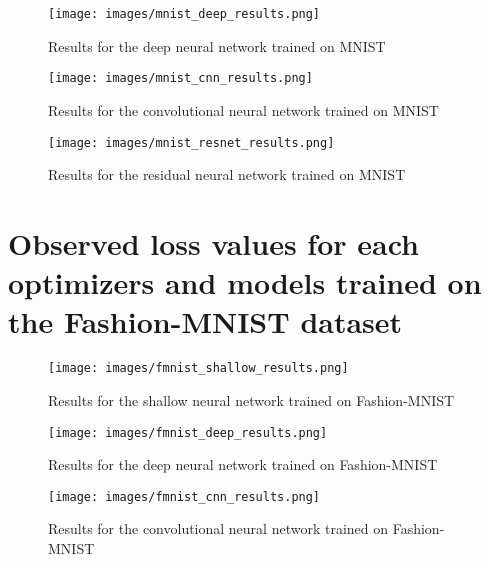 \documentclass{article} %
\begin{document}
\begin{figure}[h]
\begin{center}
\texttt{[image: images/mnist\_deep\_results.png]}
\end{center}
\caption{Results for the deep neural network trained on MNIST}
\end{figure}

\begin{figure}[h]
\begin{center}
\texttt{[image: images/mnist\_cnn\_results.png]}
\end{center}
\caption{Results for the convolutional neural network trained on MNIST}
\end{figure}

\begin{figure}[h]
\begin{center}
\texttt{[image: images/mnist\_resnet\_results.png]}
\end{center}
\caption{Results for the residual neural network trained on MNIST}
\end{figure}

\clearpage
\section{Observed loss values for each optimizers and models trained on the Fashion-MNIST dataset}

\begin{figure}[h]
\begin{center}
\texttt{[image: images/fmnist\_shallow\_results.png]}
\end{center}
\caption{Results for the shallow neural network trained on Fashion-MNIST}
\end{figure}

\begin{figure}[h]
\begin{center}
\texttt{[image: images/fmnist\_deep\_results.png]}
\end{center}
\caption{Results for the deep neural network trained on Fashion-MNIST}
\end{figure}

\begin{figure}[h]
\begin{center}
\texttt{[image: images/fmnist\_cnn\_results.png]}
\end{center}
\caption{Results for the convolutional neural network trained on Fashion-MNIST}
\end{figure}
\end{document}
